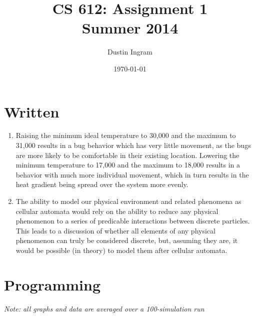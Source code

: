 \documentclass{article}
\title{CS 612: Assignment 1\\Summer 2014}
\author{Dustin Ingram}
\date{\today}
\begin{document}
\maketitle

\section*{Written}


\begin{enumerate}

\item{} %

Raising the minimum ideal temperature to 30,000 and the maximum to 31,000
results in a bug behavior which has very little movement, as the bugs are more
likely to be comfortable in their existing location. Lowering the minimum
temperature to 17,000 and the maximum to 18,000 results in a behavior with much
more individual movement, which in turn results in the heat gradient being
spread over the system more evenly.

\item{} %

The ability to model our physical environment and related phenomena as cellular
automata would rely on the ability to reduce any physical phenomenon to a
series of predicable interactions between discrete particles. This leads to a
discussion of whether all elements of any physical phenomenon can truly be
considered discrete, but, assuming they are, it would be possible (in theory)
to model them after cellular automata.

\end{enumerate}

\newpage

\section*{Programming}

\emph{Note: all graphs and data are averaged over a 100-simulation run}
\end{document}
